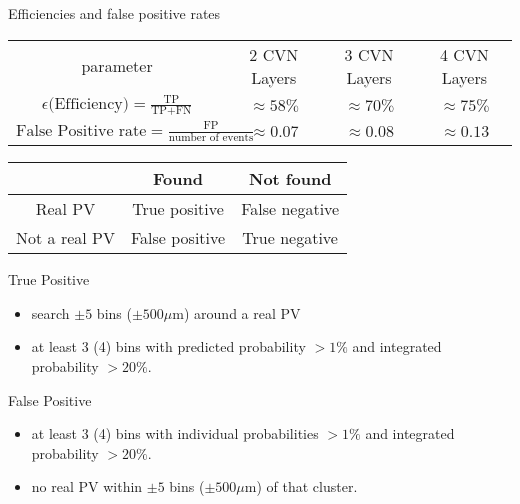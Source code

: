 \begin{frame}{Efficiencies and false positive rates}
\begin{table}[]
\centering
\begin{tabular}{cccc}
parameter & 2 CVN Layers &
3 CVN Layers & 4 CVN Layers \\ [0.3em]

$\epsilon \textrm{(Efficiency)}
 = \frac{\mbox{TP}}{\mbox{TP} + \mbox{FN}} $
&  $ \approx 58\% $  & $ \approx 70\% $ & $ \approx 75\% $ \\ [0.3em]
$ \textrm{False Positive rate}
 = \frac{\mbox{FP}}{\mbox{number of events}} $
 &  $\approx 0.07 $ & $\approx 0.08 $  & $ \approx 0.13 $ \\
 \end{tabular}
\end{table}
 \vskip -0.05in
  \begin{table}[]
      \centering
      \begin{tabular}{c|cc}
         & Found & Not found \\ \midrule
         Real PV & True positive & False negative\\
         Not a real PV & False positive & True negative
      \end{tabular}
  \end{table}
  \vskip -0.15in
  \begin{block}{True Positive}
    \begin{itemize}
    	\item search $ \pm 5 $ bins ($ \pm 500 \mu $m) around a real PV
    	\item at least 3 (4) bins with predicted probability
    	   $ > 1\% $ and
    	   integrated probability $ > 20\%$.
    \end{itemize}

    \end{block}
    \begin{block}{False Positive}
    \begin{itemize}
        \item
           at least 3 (4) bins with individual probabilities $ > 1\% $ and
          integrated probability $ > 20\%$.
        \item
        no real PV within $ \pm 5 $ bins ($ \pm 500 \mu $m) of that cluster.
    \end{itemize}
  \end{block}
\end{frame}
